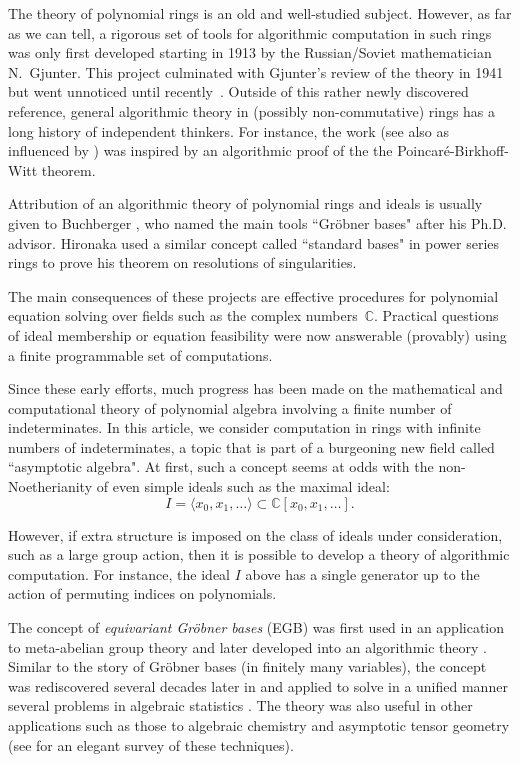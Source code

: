 The theory of polynomial rings is an old and well-studied subject.  However, as far as we can tell, a rigorous set of tools for algorithmic computation in such rings was only first developed starting in 1913 \cite{gjunter1913} by the Russian/Soviet mathematician N.~Gjunter.  This project culminated with Gjunter's review of the theory in 1941 \cite{gunther1941modules} but went unnoticed until recently~\cite{renschuch2003contributions}.  Outside of this rather newly discovered reference, general algorithmic theory in (possibly non-commutative) rings has a long history of independent thinkers.  For instance, the work \cite{bergman1978diamond} (see also \cite{bokut1976embeddings} as influenced by \cite{shirshov1962some}) was inspired by an algorithmic proof of the the Poincar\'e-Birkhoff-Witt theorem.  

Attribution of an algorithmic theory of polynomial rings and ideals is usually given to Buchberger \cite{buchberger1965algorithmus}, who named the main tools ``Gr\"obner bases" after his Ph.D. advisor. Hironaka \cite{hironaka1964resolution} used a similar concept called ``standard bases" in power series rings to prove his theorem on resolutions of singularities.  

The main consequences of these projects are effective procedures for polynomial equation solving over fields such as the complex numbers~$\mathbb{C}$.  Practical questions of ideal membership or equation feasibility were now answerable (provably) using a finite programmable set of computations.  

Since these early efforts, much progress has been made on the mathematical and computational theory of polynomial algebra involving a finite number of indeterminates.  In this article, we consider computation in rings with infinite numbers of indeterminates, a topic that is part of a burgeoning new field called ``asymptotic algebra".  At first, such a concept seems at odds with the non-Noetherianity of even simple ideals such as the maximal ideal: \[I = \langle x_0, x_1, \ldots  \rangle \subset \mathbb C[x_0, x_1,\ldots].\]

However, if extra structure is imposed on the class of ideals under consideration, such as a large group action, then it is possible to develop a theory of algorithmic computation.  For instance, the ideal $I$ above has a single generator up to the action of permuting indices on polynomials.

The concept of \emph{equivariant Gr\"obner bases} (EGB) was first used in an application to meta-abelian group theory \cite{cohen1967laws} and later developed into an algorithmic theory \cite{Emmott, Cohen87}. Similar to the story of Gr\"obner bases (in finitely many variables), the concept was rediscovered several decades later in \cite{aschenbrenner2007finite, aschenbrenner2008algorithm} and applied to solve in a unified manner several problems in algebraic statistics \cite{hillar2012finite}.  The theory was also useful in other applications such as those to algebraic chemistry \cite{Draisma08b} and asymptotic tensor geometry \cite{draisma2014bounded} (see \cite{draisma2014noetherianity} for an elegant survey of these techniques).

